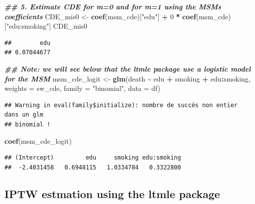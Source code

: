 \documentclass[
]{book}
\newenvironment{Shaded}{\begin{snugshade}}{\end{snugshade}}
\newcommand{\AttributeTok}[1]{\textcolor[rgb]{0.13,0.29,0.53}{#1}}
\newcommand{\DecValTok}[1]{\textcolor[rgb]{0.00,0.00,0.81}{#1}}
\newcommand{\DocumentationTok}[1]{\textcolor[rgb]{0.56,0.35,0.01}{\textbf{\textit{#1}}}}
\newcommand{\FunctionTok}[1]{\textcolor[rgb]{0.13,0.29,0.53}{\textbf{#1}}}
\newcommand{\NormalTok}[1]{#1}
\newcommand{\OtherTok}[1]{\textcolor[rgb]{0.56,0.35,0.01}{#1}}
\newcommand{\SpecialCharTok}[1]{\textcolor[rgb]{0.81,0.36,0.00}{\textbf{#1}}}
\newcommand{\StringTok}[1]{\textcolor[rgb]{0.31,0.60,0.02}{#1}}
\begin{document}
\begin{Shaded}
\begin{Highlighting}[]
\DocumentationTok{\#\# 5. Estimate CDE for m=0 and for m=1 using the MSM\textquotesingle{}s coefficients}
\NormalTok{CDE\_mis0 }\OtherTok{\textless{}{-}} \FunctionTok{coef}\NormalTok{(msm\_cde)[}\StringTok{"edu"}\NormalTok{] }\SpecialCharTok{+} \DecValTok{0} \SpecialCharTok{*} \FunctionTok{coef}\NormalTok{(msm\_cde)[}\StringTok{"edu:smoking"}\NormalTok{]}
\NormalTok{CDE\_mis0}
\end{Highlighting}
\end{Shaded}

\begin{verbatim}
##        edu 
## 0.07044677
\end{verbatim}

\begin{Shaded}
\begin{Highlighting}[]
\DocumentationTok{\#\# Note: we will see below that the ltmle package use a logistic model for the MSM}
\NormalTok{msm\_cde\_logit }\OtherTok{\textless{}{-}} \FunctionTok{glm}\NormalTok{(death }\SpecialCharTok{\textasciitilde{}}\NormalTok{ edu }\SpecialCharTok{+}\NormalTok{ smoking }\SpecialCharTok{+}\NormalTok{ edu}\SpecialCharTok{:}\NormalTok{smoking,}
                     \AttributeTok{weights =}\NormalTok{ sw\_cde,}
                     \AttributeTok{family =} \StringTok{"binomial"}\NormalTok{,}
                     \AttributeTok{data =}\NormalTok{ df)}
\end{Highlighting}
\end{Shaded}

\begin{verbatim}
## Warning in eval(family$initialize): nombre de succès non entier dans un glm
## binomial !
\end{verbatim}

\begin{Shaded}
\begin{Highlighting}[]
\FunctionTok{coef}\NormalTok{(msm\_cde\_logit)}
\end{Highlighting}
\end{Shaded}

\begin{verbatim}
## (Intercept)         edu     smoking edu:smoking 
##  -2.4031458   0.6948115   1.0334784   0.3322800
\end{verbatim}

\subsection{IPTW estmation using the ltmle package}\label{iptw-estmation-using-the-ltmle-package}
\end{document}
